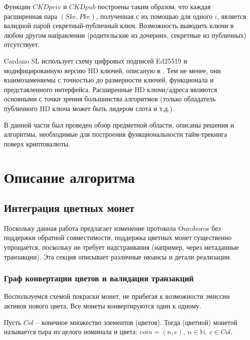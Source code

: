 \documentclass[specification,annotation]{itmo-student-thesis}
\begin{document}
Функции $CKDpriv$ и $CKDpub$ построены таким образом, что каждая
расширенная пара $(Ske,Pke)$, полученная с их помощью для одного $i$,
является валидной парой секретный-публичный ключ. Возможность выводить
ключи в любом другом направлении (родительские из дочерних, секретные
из публичных) отсутствует.

Cardano SL использует схему цифровых подписей Ed25519
\cite{bernstein2012high} и модифицированную версию HD ключей, описаную
в \cite{ed25519hd}. Тем не менее, они взаимозаменяемы с точностью до
размерности ключей, функционала и представленного
интерфейса. Расширенные HD ключи/адреса являются основными с точки
зрения большинства алгоритмов (только обладатель публичного HD ключа
может быть лидером слота и т.д.).

\chapterconclusion

В данной части был проведен обзор предметной области, описаны решения
и алгоритмы, необходимые для построения функциональности тайм-трекинга
поверх криптовалюты.

\chapter{Описание алгоритма}

\section{Интеграция цветных монет}

Поскольку данная работа предлагает изменение протокола Ouroboros без
поддержки обратной совместимости, поддержка цветных монет существенно
упрощается, поскольку не требует надстраивания (например, через
метаданные транзакции). Эта секция описывает различные нюансы и детали
реализации.

\subsection{Граф конвертации цветов и валидация транзакций}

Воспользуемся схемой покраски монет, не прибегая к возможности эмиссии
активов нового цвета. Все монеты конвертируются один к одному.

\begin{definition}
Пусть $Col$ -- конечное множество элементов (цветов). Тогда (цветной)
монетой называется пара из целого номинала и цвета: $coin = (n,c), \ n
\in \mathbb{N}, \ c \in Col$.
\end{definition}
\end{document}
